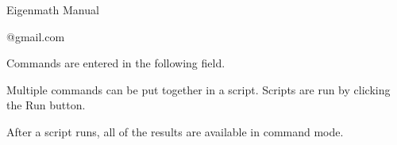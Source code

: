 \documentclass[12pt]{article}
\begin{document}
\newpage
\begin{center}
{\LARGE Eigenmath Manual}

@gmail.com
\end{center}

Commands are entered in the following field.

\begin{center}
\end{center}

Multiple commands can be put together in a script.
Scripts are run by clicking the Run button.

\begin{center}
\end{center}

After a script runs, all of the results are available in command mode.
\end{document}
